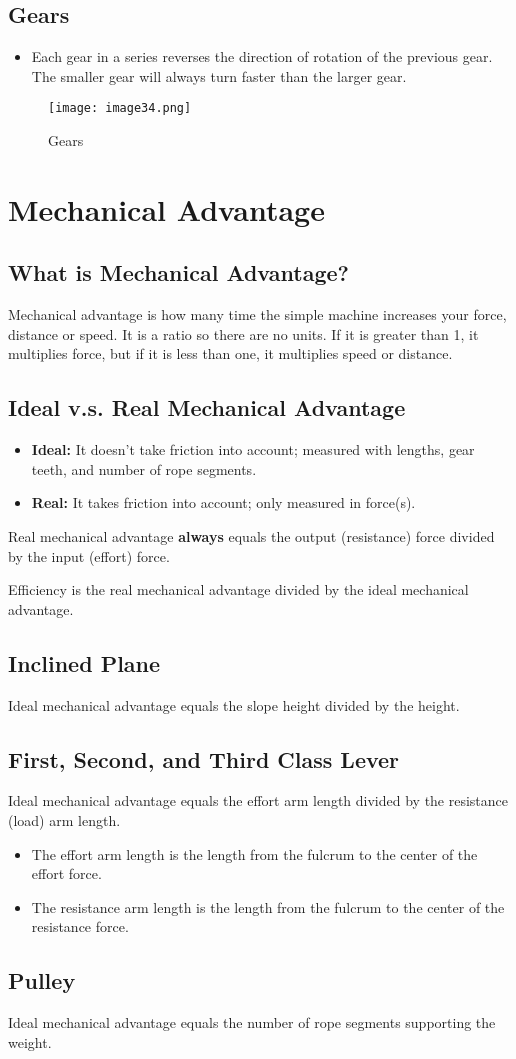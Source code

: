 \documentclass[12pt]{scrartcl}
\begin{document}
\subsection{Gears}
\begin{itemize}
    \item Each gear in a series reverses the direction of rotation of the previous gear. The smaller gear will always turn faster than the larger gear. 
\end{itemize}
\begin{figure}
    \centering
    \texttt{[image: image34.png]}
    \caption{Gears}
\end{figure}
\section{Mechanical Advantage}
\subsection{What is Mechanical Advantage?}
Mechanical advantage is how many time the simple machine increases your force, distance or speed. It is a ratio so there are no units. If it is greater than 1, it multiplies force, but if it is less than one, it multiplies speed or distance. 

\subsection{Ideal v.s. Real Mechanical Advantage}
\begin{itemize}
    \item \textbf{Ideal:} It doesn't take friction into account; measured with lengths, gear teeth, and number of rope segments.
    \item \textbf{Real:} It takes friction into account; only measured in force(s). 
\end{itemize}
\noindent Real mechanical advantage \textbf{always} equals the output (resistance) force divided by the input (effort) force.

\bigskip \noindent Efficiency is the real mechanical advantage divided by the ideal mechanical advantage.

\subsection{Inclined Plane}
Ideal mechanical advantage equals the slope height divided by the height.

\subsection{First, Second, and Third Class Lever}
Ideal mechanical advantage equals the effort arm length divided by the resistance (load) arm length.
\begin{itemize}
    \item The effort arm length is the length from the fulcrum to the center of the effort force.
    \item The resistance arm length is the length from the fulcrum to the center of the resistance force.
\end{itemize}
\subsection{Pulley}
Ideal mechanical advantage equals the number of rope segments supporting the weight.
\end{document}
